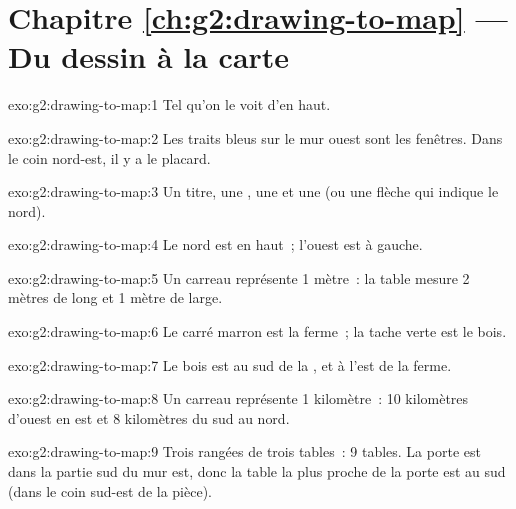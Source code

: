 \section*{Chapitre \ref{ch:g2:drawing-to-map} --- Du dessin à la carte}

\begin{solution}{exo:g2:drawing-to-map:1}
Tel qu'on le voit d'en haut.
\end{solution}

\begin{solution}{exo:g2:drawing-to-map:2}
Les traits bleus sur le mur ouest sont les fenêtres. Dans le coin nord-est,
il y a le placard.
\end{solution}

\begin{solution}{exo:g2:drawing-to-map:3}
Un titre, une , une  et une  (ou une flèche qui indique le nord).
\end{solution}

\begin{solution}{exo:g2:drawing-to-map:4}
Le nord est en haut~; l'ouest est à gauche.
\end{solution}

\begin{solution}{exo:g2:drawing-to-map:5}
Un carreau représente 1 mètre~: la table mesure 2 mètres de long et 1 mètre de large.
\end{solution}

\begin{solution}{exo:g2:drawing-to-map:6}
Le carré marron est la ferme~; la tache verte est le bois.
\end{solution}

\begin{solution}{exo:g2:drawing-to-map:7}
Le bois est au sud de la , et à l'est de la ferme.
\end{solution}

\begin{solution}{exo:g2:drawing-to-map:8}
Un carreau représente 1 kilomètre~: 10 kilomètres d'ouest en est et
8 kilomètres du sud au nord.
\end{solution}

\begin{solution}{exo:g2:drawing-to-map:9}
Trois rangées de trois tables~: 9 tables. La porte est dans la partie sud
du mur est, donc la table la plus proche de la porte est au sud (dans le
coin sud-est de la pièce).
\end{solution}

